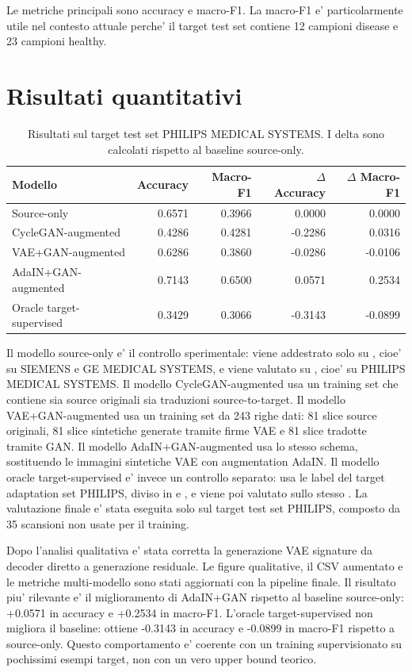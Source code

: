 \documentclass[12pt,a4paper]{article}
\begin{document}
Le metriche principali sono accuracy e macro-F1. La macro-F1 e' particolarmente utile nel contesto attuale perche' il target test set contiene 12 campioni disease e 23 campioni healthy.

\section{Risultati quantitativi}

\begin{table}[H]
\centering
\caption{Risultati sul target test set PHILIPS MEDICAL SYSTEMS. I delta sono calcolati rispetto al baseline source-only.}
\begin{tabular}{lrrrr}
\toprule
Modello & Accuracy & Macro-F1 & $\Delta$ Accuracy & $\Delta$ Macro-F1 \\
\midrule
Source-only & 0.6571 & 0.3966 & 0.0000 & 0.0000 \\
CycleGAN-augmented & 0.4286 & 0.4281 & -0.2286 & 0.0316 \\
VAE+GAN-augmented & 0.6286 & 0.3860 & -0.0286 & -0.0106 \\
AdaIN+GAN-augmented & 0.7143 & 0.6500 & 0.0571 & 0.2534 \\
Oracle target-supervised & 0.3429 & 0.3066 & -0.3143 & -0.0899 \\
\bottomrule
\end{tabular}
\end{table}

Il modello source-only e' il controllo sperimentale: viene addestrato solo su , cioe' su SIEMENS e GE MEDICAL SYSTEMS, e viene valutato su , cioe' su PHILIPS MEDICAL SYSTEMS. Il modello CycleGAN-augmented usa un training set che contiene sia source originali sia traduzioni source-to-target. Il modello VAE+GAN-augmented usa un training set da 243 righe dati: 81 slice source originali, 81 slice sintetiche generate tramite firme VAE e 81 slice tradotte tramite GAN. Il modello AdaIN+GAN-augmented usa lo stesso schema, sostituendo le immagini sintetiche VAE con augmentation AdaIN. Il modello oracle target-supervised e' invece un controllo separato: usa le label del target adaptation set PHILIPS, diviso in  e , e viene poi valutato sullo stesso . La valutazione finale e' stata eseguita solo sul target test set PHILIPS, composto da 35 scansioni non usate per il training.

Dopo l'analisi qualitativa e' stata corretta la generazione VAE signature da decoder diretto a generazione residuale. Le figure qualitative, il CSV aumentato e le metriche multi-modello sono stati aggiornati con la pipeline finale. Il risultato piu' rilevante e' il miglioramento di AdaIN+GAN rispetto al baseline source-only: +0.0571 in accuracy e +0.2534 in macro-F1. L'oracle target-supervised non migliora il baseline: ottiene -0.3143 in accuracy e -0.0899 in macro-F1 rispetto a source-only. Questo comportamento e' coerente con un training supervisionato su pochissimi esempi target, non con un vero upper bound teorico.
\end{document}
